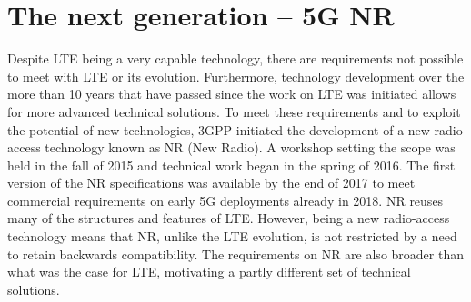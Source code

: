 \section{The next generation – 5G NR}
Despite LTE being a very capable technology, there are requirements not possible to meet with LTE or its evolution. Furthermore, technology development over the more than 10 years that have passed since the work on LTE was initiated allows for more advanced technical solutions. To meet these requirements and to exploit the potential of new technologies, 3GPP initiated the development of a new radio access technology known as NR (New Radio). A workshop setting the scope was held in the fall of 2015 and technical work began in the spring of 2016. The first version of the NR specifications was available by the end of 2017 to meet commercial requirements on early 5G deployments already in 2018.
NR reuses many of the structures and features of LTE. However, being a new radio-access technology means that NR, unlike the LTE evolution, is not restricted by a need to retain backwards compatibility. The requirements on NR are also broader than what was the case for LTE, motivating a partly different set of technical solutions.

